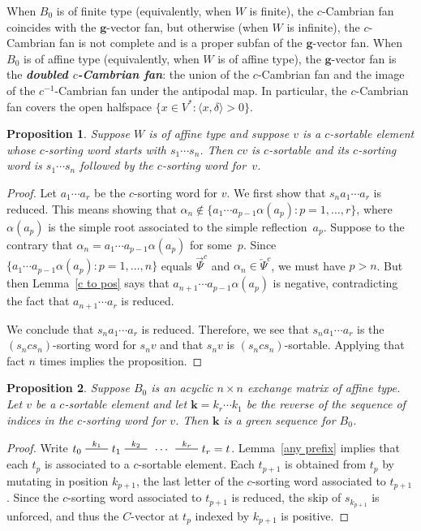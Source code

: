 \documentclass[10pt]{article}
\newtheorem{proposition}{Proposition}[section]
\theoremstyle{definition}
\theoremstyle{remark}
\numberwithin{equation}{section}
\newcommand{\newword}[1]{\textbf{\emph{#1}}}
\newcommand{\edge}{\,\,\rule[2.7pt]{20pt}{0.5pt}\,\,}
\newcommand{\set}[1]{{\lbrace #1 \rbrace}}
\newcommand{\br}[1]{{\langle #1 \rangle}}
\newcommand{\0}{{\mathbf{0}}}
\newcommand{\g}{\mathbf{g}}
\newcommand{\kk}{{\boldsymbol{k}}}
\newcommand{\TravInfChar}{\Psi}
\newcommand{\TravProj}[1]{\overrightarrow{\TravInfChar}^{#1}}
\newcommand{\TravInj}[1]{\overleftarrow{\TravInfChar}^{#1}}
\begin{document}
When $B_0$ is of finite type (equivalently, when $W$ is finite), the $c$-Cambrian fan coincides with the $\g$-vector fan, but otherwise (when $W$ is infinite), the $c$-Cambrian fan is not complete and is a proper subfan of the $\g$-vector fan.
When $B_0$ is of affine type (equivalently, when $W$ is of affine type), the $\g$-vector fan is the \newword{doubled $c$-Cambrian fan}: the union of the \mbox{$c$-Cambrian} fan and the image of the \mbox{$c^{-1}$-Cambrian} fan under the antipodal map.  %
In particular, the $c$-Cambrian fan covers the open halfspace $\set{x\in V^*:\br{x,\delta}>0}$.

\begin{proposition}\label{tack on c}
Suppose $W$ is of affine type and suppose $v$ is a $c$-sortable element whose $c$-sorting word starts with $s_1\cdots s_n$.
Then $cv$ is $c$-sortable and its $c$-sorting word is $s_1\cdots s_n$ followed by the $c$-sorting word for~$v$.
\end{proposition}
\begin{proof}
Let $a_1\cdots a_r$ be the $c$-sorting word for $v$.
We first show that $s_na_1\cdots a_r$ is reduced.
This means showing that $\alpha_n\not\in\set{a_1\cdots a_{p-1}\alpha(a_p):p=1,\ldots,r}$, where $\alpha(a_p)$ is the simple root associated to the simple reflection~$a_p$.
Suppose to the contrary that $\alpha_n=a_1\cdots a_{p-1}\alpha(a_p)$ for some~$p$.
Since $\set{a_1\cdots a_{p-1}\alpha(a_p):p=1,\ldots,n}$ equals $\TravProj{c}$ and $\alpha_n\in \TravInj{c}$, we must have $p>n$.
But then Lemma~\ref{c to pos} says that $a_{n+1}\cdots a_{p-1}\alpha(a_p)$ is negative, contradicting the fact that $a_{n+1}\cdots a_r$ is reduced.

We conclude that $s_na_1\cdots a_r$ is reduced.
Therefore, we see that $s_na_1\cdots a_r$ is the $(s_ncs_n)$-sorting word for $s_nv$ and that $s_nv$ is $(s_ncs_n)$-sortable.
Applying that fact $n$ times implies the proposition.
\end{proof}

\begin{proposition}\label{sort green}
Suppose $B_0$ is an acyclic $n\times n$ exchange matrix of affine type.
Let $v$ be a $c$-sortable element and let $\kk=k_r\cdots k_1$ be the \emph{reverse} of the sequence of indices in the $c$-sorting word for $v$.
Then $\kk$ is a green sequence for $B_0$.
\end{proposition}
\begin{proof}
Write $t_0\overset{k_1}{\edge}t_1\overset{k_2}{\edge}\,\cdots\,\overset{k_r}{\edge}t_r=t$.
Lemma~\ref{any prefix} implies that each $t_p$ is associated to a $c$-sortable element.
Each $t_{p+1}$ is obtained from $t_p$ by mutating in position $k_{p+1}$, the last letter of the $c$-sorting word associated to $t_{p+1}$.
Since the $c$-sorting word associated to $t_{p+1}$ is reduced, the skip of $s_{k_{p+1}}$ is unforced, and thus the $C$-vector at $t_p$ indexed by $k_{p+1}$ is positive.
\end{proof}
\end{document}

